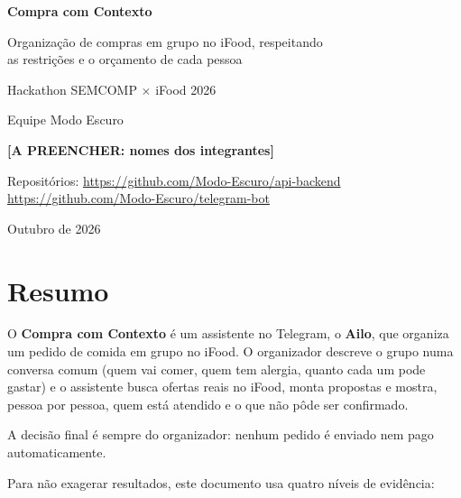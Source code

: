 \documentclass[11pt,a4paper]{article}
\newif\ifcenarioA
\newcommand{\preencher}[1]{\textcolor{destaque}{\textbf{[A PREENCHER: #1]}}}
\begin{document}
\begin{titlepage}
\centering
\vspace*{3cm}
{\Huge\bfseries Compra com Contexto\par}
\vspace{0.6cm}
{\Large Organização de compras em grupo no iFood, respeitando\\ as restrições e o orçamento de cada pessoa\par}
\vspace{1.5cm}
{\large Hackathon SEMCOMP $\times$ iFood 2026\par}
\vspace{0.3cm}
{\large Equipe Modo Escuro\par}
\vspace{0.3cm}
{\normalsize \preencher{nomes dos integrantes}\par}
\vfill
{\small Repositórios: \url{https://github.com/Modo-Escuro/api-backend} \textperiodcentered{} \url{https://github.com/Modo-Escuro/telegram-bot}\par}
\vspace{0.3cm}
{\small Outubro de 2026\par}
\end{titlepage}

\tableofcontents
\newpage

\section*{Resumo}

O \textbf{Compra com Contexto} é um assistente no Telegram, o \textbf{Ailo}, que organiza um pedido de comida em grupo no iFood. O organizador descreve o grupo numa conversa comum (quem vai comer, quem tem alergia, quanto cada um pode gastar) e o assistente busca ofertas reais no iFood, monta propostas e mostra, pessoa por pessoa, quem está atendido e o que não pôde ser confirmado.
\ifcenarioA
Depois que o organizador revisa e confirma, o sistema prepara o carrinho real no iFood. Nenhum pedido é enviado nem pago automaticamente.
\else
A decisão final é sempre do organizador: nenhum pedido é enviado nem pago automaticamente.
\fi

Para não exagerar resultados, este documento usa quatro níveis de evidência:
\end{document}
